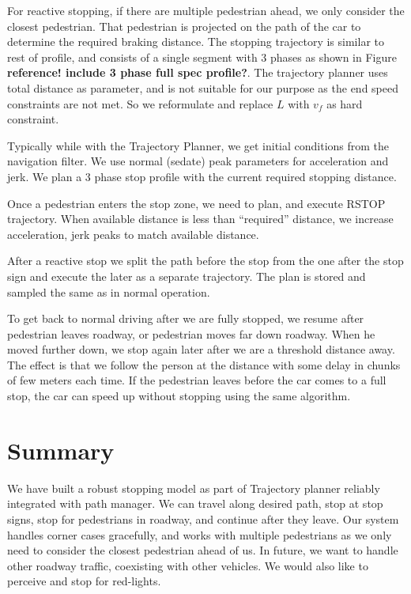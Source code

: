 \documentclass[letterpaper, 10 pt, conference]{ieeeconf}  %
\begin{document}
For reactive stopping, if there are multiple pedestrian ahead, we only consider the
closest pedestrian.
That pedestrian is projected on the path of the car to determine the required braking distance.
The stopping trajectory is similar to rest of profile, and consists of a single segment with 3 phases as shown in Figure \textbf{reference! include 3 phase full spec profile?}. 
The trajectory planner uses total distance as parameter, and is not suitable for our purpose as the end speed constraints are not met. So we reformulate and replace $L$ with $v_f$ as hard constraint.

Typically while with the Trajectory Planner, we get initial conditions from the navigation filter.
We use normal (sedate) peak parameters for acceleration and jerk.
We plan a 3 phase stop profile with the current required stopping distance.

Once a pedestrian enters the stop zone, we need to plan, and execute RSTOP trajectory.
When available distance is less than “required” distance, we increase acceleration, jerk peaks to match available distance.

After a reactive stop we split the path before the stop from the one after the stop
sign and execute the later as a separate trajectory. The plan is stored and sampled 
the same as in normal operation.

To get back to normal driving after we are fully stopped, we resume
after pedestrian leaves roadway, or pedestrian moves far down roadway.
When he moved further down, we stop again later after we are a threshold
distance away. The effect is that we follow the person at the distance with some 
delay in chunks of few meters each time. If the pedestrian leaves before 
the car comes to a full stop, the car can speed up without stopping using the 
same algorithm.


\section{Summary} \label{sec:summary}

We have built a robust stopping model as part of Trajectory planner reliably integrated with path manager.
We can travel along desired path, stop at stop signs, stop for pedestrians in roadway, and continue after 
they leave. Our system handles corner cases gracefully, and works with multiple pedestrians as we only 
need to consider the closest pedestrian ahead of us. In future, we want to handle other roadway traffic, 
coexisting with other vehicles. We would also like to perceive and stop for red-lights.




\end{document}
